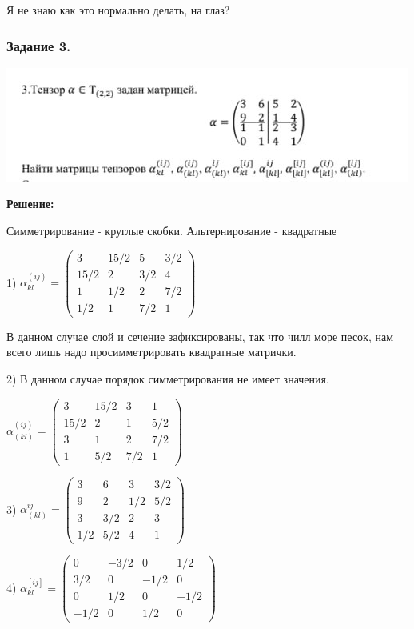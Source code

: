 Я не знаю как это нормально делать, на глаз?

\subsubsection{Задание 3.}

\begin{center}
   \includegraphics{assets/homework-3-task-3.jpg}
\end{center}

\textbf{Решение:}

Симметрирование - круглые скобки. Альтернирование - квадратные

1) $\alpha^{(ij)}_{kl} = \begin{pmatrix}
    3 & 15/2 & 5 & 3/2 \\
    15/2 & 2 & 3/2 & 4 \\
    1 & 1/2 & 2 & 7/2 \\
    1/2 & 1 & 7/2 & 1
\end{pmatrix}$

В данном случае слой и сечение зафиксированы, так что чилл море песок, нам всего лишь надо просимметрировать квадратные матрички.

2)  В данном случае порядок симметрирования не имеет значения.

$\alpha^{(ij)}_{(kl)} = \begin{pmatrix}
    3 & 15/2 & 3 & 1 \\
    15/2 & 2 & 1 & 5/2 \\
    3 & 1 & 2 & 7/2 \\
    1 & 5/2 & 7/2 & 1
\end{pmatrix}$

3) $\alpha^{ij}_{(kl)} =\begin{pmatrix}
    3 & 6 & 3 & 3/2\\
    9 & 2 & 1/2 & 5/2 \\
    3 & 3/2 & 2 & 3 \\
    1/2 & 5/2 & 4 & 1
\end{pmatrix}$

4) $\alpha^{[ij]}_{kl} = \begin{pmatrix}
    0 & -3/2 & 0 & 1/2 \\
    3/2 & 0 & -1/2 & 0 \\
    0 & 1/2 & 0 & -1/2\\
    -1/2 & 0 & 1/2 & 0
\end{pmatrix}$

